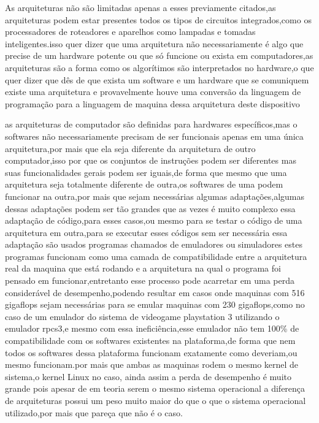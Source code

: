 \documentclass[
	12pt,				%
	openright,			%
	oneside,			%
	a4paper,			%
	english,			%
	french,				%
	spanish,			%
	brazil,				%
	]{abntex2}
\begin{document}
As arquiteturas não são limitadas apenas a esses previamente citados,as arquiteturas podem estar presentes todos os tipos de circuitos integrados,como os processadores de roteadores e aparelhos  como lampadas e tomadas inteligentes.isso quer dizer que uma arquitetura não necessariamente é algo que precise de um hardware potente ou que só funcione ou exista em computadores,as arquiteturas são a forma como os algorítimos são interpretados no hardware,o que quer dizer que dês de que exista um software e um hardware que se comuniquem existe uma arquitetura e provavelmente houve uma conversão da linguagem de programação para a linguagem de maquina dessa arquitetura deste dispositivo\newline

as arquiteturas de computador são definidas para hardwares específicos,mas o softwares não necessariamente precisam de ser funcionais apenas em uma única arquitetura,por mais que ela seja diferente da arquitetura de outro computador,isso por que os conjuntos de instruções podem ser diferentes mas suas funcionalidades gerais podem ser iguais,de forma que mesmo que uma arquitetura seja totalmente diferente de outra,os softwares de uma podem funcionar na outra,por mais que sejam necessárias algumas adaptações,algumas dessas adaptações podem ser tão grandes que as vezes é muito complexo essa adaptação de código,para esses casos,ou mesmo para se testar o código de uma arquitetura em outra,para se executar esses códigos sem ser necessária essa adaptação são usados programas chamados de emuladores ou simuladores estes programas funcionam como uma camada de compatibilidade entre a arquitetura real da maquina que está rodando e a arquitetura na qual o programa foi pensado em funcionar,entretanto esse processo pode acarretar em uma perda considerável de desempenho,podendo resultar em casos onde maquinas com  516 gigaflops sejam necessárias para se emular maquinas com 230 gigaflops,como no caso de um emulador do sistema de videogame playstation 3 utilizando o emulador rpcs3,e mesmo com essa ineficiência,esse emulador não tem 100\% de compatibilidade com os softwares existentes na plataforma,de forma que nem todos os softwares dessa plataforma funcionam exatamente como deveriam,ou mesmo funcionam.por mais que ambas as maquinas rodem o mesmo kernel de sistema,o kernel Linux no caso, ainda assim a perda de desempenho é muito grande pois apesar de em teoria serem o mesmo sistema operacional a diferença de arquiteturas possui um peso muito maior do que o que o sistema operacional utilizado,por mais que pareça que não é o caso.\newline
\end{document}
